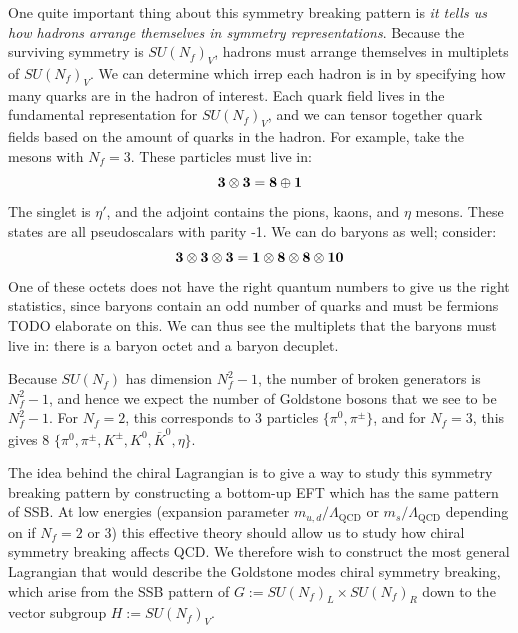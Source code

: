 \documentclass[11pt, oneside]{article}   	%
\theoremstyle{definition}
\numberwithin{equation}{subsection}		%
\begin{document}
One quite important thing about this symmetry breaking pattern is \textit{it tells us how hadrons arrange themselves in symmetry 
representations}. Because the surviving symmetry is $SU(N_f)_V$, hadrons must arrange themselves in multiplets of $SU(N_f)_V$. 
We can determine which irrep each hadron is in by specifying how many quarks are in the hadron of interest. Each quark field 
lives in the fundamental representation for $SU(N_f)_V$, and we can tensor together quark fields based on the amount of quarks in the 
hadron. For example, take the mesons with $N_f = 3$. These particles must live in:
\begin{equation}
	\textnormal{\textbf{3}}\otimes \textnormal{\textbf{3}} = \textnormal{\textbf{8}}\oplus \textnormal{\textbf{1}}
\end{equation}
The singlet is $\eta'$, and the adjoint contains the pions, kaons, and $\eta$ mesons. These states are all pseudoscalars with parity -1. 
We can do baryons as well; consider:
\begin{equation}
	\textnormal{\textbf{3}}\otimes \textnormal{\textbf{3}}\otimes \textnormal{\textbf{3}} = \textnormal{\textbf{1}}\otimes \textnormal{\textbf{8}}
	\otimes \textnormal{\textbf{8}}\otimes \textnormal{\textbf{10}}
\end{equation}
One of these octets does not have the right quantum numbers to give us the right statistics, since baryons contain an odd number of 
quarks and must be fermions{\color{red} TODO elaborate on this}. We can thus see the multiplets that the baryons must live in: there is 
a baryon octet and a baryon decuplet. 

Because $SU(N_f)$ has dimension $N_f^2 - 1$, the number of broken generators is $N_f^2 - 1$, and hence we expect the number of 
Goldstone bosons that we see to be $N_f^2 - 1$. For $N_f = 2$, this corresponds to 3 particles $\{\pi^0, \pi^\pm\}$, and for $N_f = 3$, this 
gives 8 $\{\pi^0, \pi^\pm, K^\pm, K^0, \overline K^0, \eta\}$. 

The idea behind the chiral Lagrangian is to give a way to study this symmetry breaking pattern by constructing a bottom-up EFT 
which has the same pattern of SSB. At low energies (expansion parameter $m_{u, d} / \Lambda_\mathrm{QCD}$  or 
$m_s / \Lambda_\mathrm{QCD}$ depending on if $N_f = 2$ or $3$) this effective theory should allow us to study how chiral 
symmetry breaking affects QCD. We therefore wish to construct the most general Lagrangian that would describe the Goldstone modes 
chiral symmetry breaking, which arise from the SSB pattern of $G := SU(N_f)_L\times SU(N_f)_R$ down to the vector subgroup 
$H := SU(N_f)_V$. 
\end{document}
